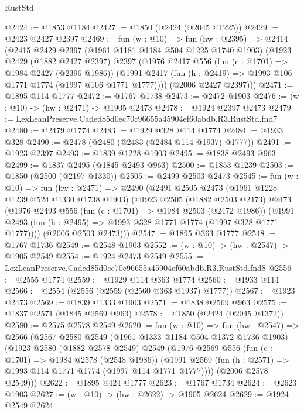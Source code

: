 \begin{lexlean}{RustStd}
\begin{coremodule}
@2424 := @1853 @1184
@2427 := @1850 (@2424 (@2045 @1225))
@2429 := @2423 @2427 @2397
@2469 := fun (w : @10) =>
  fun (hw : @2395) =>
  @2414
    (@2415
      @2429
      @2397
      (@1961 @1181 @1184 @504 @1225 @1740 @1903)
      (@1923
        @2429
        (@1882 @2427 @2397)
        @2397
        (@1976
          @2417
          @556
          (fun (c : @1701) => @1984 @2427 (@2396 @1986))
          (@1991 @2417 (fun (h : @2419) => @1993 @106 @1771 @1774 (@1997 @106 @1771 @1777))))
        (@2006 @2427 @2397)))
@2471 := @1895 @114 @1777
@2472 := @1767 @1738
@2473 := @2472 @1903
@2476 := (w : @10) -> (hw : @2471) -> @1905 @2473
@2478 := @1924 @2397 @2473
@2479 := LexLeanPreserve.Caded85d0ec70c96655a45904ef60abdb.R3.RustStd.fnd7
@2480 := @2479 @1774
@2483 := @1929 @328 @114 @1774
@2484 := @1933 @328
@2490 := @2478 (@2480 (@2483 (@2484 @114 @1937) @1777))
@2491 := @1923 @2397
@2493 := @1839 @1228 @1903
@2495 := @1838 @2493 @963
@2499 := @1837 @2495 (@1845 @2493 @963)
@2500 := @1853 @1239
@2503 := @1850 (@2500 (@2197 @1330))
@2505 := @2499 @2503 @2473
@2545 := fun (w : @10) =>
  fun (hw : @2471) =>
  @2490
    (@2491
      @2505
      @2473
      (@1961 @1228 @1239 @524 @1330 @1738 @1903)
      (@1923
        @2505
        (@1882 @2503 @2473)
        @2473
        (@1976
          @2493
          @556
          (fun (c : @1701) => @1984 @2503 (@2472 @1986))
          (@1991 @2493 (fun (h : @2495) => @1993 @328 @1771 @1774 (@1997 @328 @1771 @1777))))
        (@2006 @2503 @2473)))
@2547 := @1895 @363 @1777
@2548 := @1767 @1736
@2549 := @2548 @1903
@2552 := (w : @10) -> (hw : @2547) -> @1905 @2549
@2554 := @1924 @2473 @2549
@2555 := LexLeanPreserve.Caded85d0ec70c96655a45904ef60abdb.R3.RustStd.fnd8
@2556 := @2555 @1774
@2559 := @1929 @114 @363 @1774
@2560 := @1933 @114
@2566 := @2554 (@2556 (@2559 (@2560 @363 @1937) @1777))
@2567 := @1923 @2473
@2569 := @1839 @1333 @1903
@2571 := @1838 @2569 @963
@2575 := @1837 @2571 (@1845 @2569 @963)
@2578 := @1850 (@2424 (@2045 @1372))
@2580 := @2575 @2578 @2549
@2620 := fun (w : @10) =>
  fun (hw : @2547) =>
  @2566
    (@2567
      @2580
      @2549
      (@1961 @1333 @1184 @504 @1372 @1736 @1903)
      (@1923
        @2580
        (@1882 @2578 @2549)
        @2549
        (@1976
          @2569
          @556
          (fun (c : @1701) => @1984 @2578 (@2548 @1986))
          (@1991 @2569 (fun (h : @2571) => @1993 @114 @1771 @1774 (@1997 @114 @1771 @1777))))
        (@2006 @2578 @2549)))
@2622 := @1895 @424 @1777
@2623 := @1767 @1734
@2624 := @2623 @1903
@2627 := (w : @10) -> (hw : @2622) -> @1905 @2624
@2629 := @1924 @2549 @2624

\end{coremodule}
\end{lexlean}

